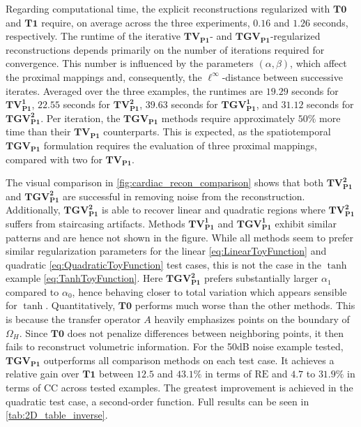 \documentclass{article}
\begin{document}
	
	Regarding computational time, the explicit reconstructions regularized with $\mathbf{T0}$ and $\mathbf{T1}$ require, on average across the three experiments, $0.16$ and $1.26$ seconds, respectively.
	The runtime of the iterative $\mathbf{TV_{P1}}$- and $\mathbf{TGV_{P1}}$-regularized reconstructions depends primarily on the number of iterations required for convergence.
	This number is influenced by the parameters $(\alpha,\beta)$, which affect the proximal mappings and, consequently, the $\ell^\infty$-distance between successive iterates.
	Averaged over the three examples, the runtimes are $19.29$ seconds for $\mathbf{TV_{P1}^1}$, $22.55$ seconds for $\mathbf{TV_{P1}^2}$, $39.63$ seconds for $\mathbf{TGV_{P1}^1}$, and $31.12$ seconds for $\mathbf{TGV_{P1}^2}$.
	Per iteration, the $\mathbf{TGV_{P1}}$ methods require approximately $50\%$ more time than their $\mathbf{TV_{P1}}$ counterparts.
	This is expected, as the spatiotemporal $\mathbf{TGV_{P1}}$ formulation requires the evaluation of three proximal mappings, compared with two for $\mathbf{TV_{P1}}$.
	
	The visual comparison in \cref{fig:cardiac_recon_comparison} shows that both $\mathbf{TV_{P1}^2}$ and $\mathbf{TGV_{P1}^2}$ are successful in removing noise from the reconstruction. 
	Additionally, $\mathbf{TGV_{P1}^2}$ is able to recover linear and quadratic regions where $\mathbf{TV_{P1}^2}$ suffers from staircasing artifacts.
	Methods $\mathbf{TV_{P1}^1}$ and $\mathbf{TGV_{P1}^1}$ exhibit similar patterns and are hence not shown in the figure.
	While all methods seem to prefer similar regularization parameters for the linear \eqref{eq:LinearToyFunction} and quadratic \eqref{eq:QuadraticToyFunction} test cases, this is not the case in the $\tanh$ example \eqref{eq:TanhToyFunction}.
	Here $\mathbf{TGV_{P1}^2}$ prefers substantially larger $\alpha_1$ compared to $\alpha_0$, hence behaving closer to total variation which appears sensible for $\tanh$.
	Quantitatively, $\mathbf{T0}$ performs much worse than the other methods.
	This is because the transfer operator $A$ heavily emphasizes points on the boundary of $\Omega_H$.
	Since $\mathbf{T0}$ does not penalize differences between neighboring points, it then fails to reconstruct volumetric information.
	For the 50dB noise example tested, $\mathbf{TGV_{P1}}$ outperforms all comparison methods on each test case.
	It achieves a relative gain over $\mathbf{T1}$ between $12.5$ and $43.1\%$ in terms of $\mathrm{RE}$ and $4.7$ to $31.9\%$ in terms of $\mathrm{CC}$ across tested examples.
	The greatest improvement is achieved in the quadratic test case, a second-order function.
	Full results can be seen in \cref{tab:2D_table_inverse}.
\end{document}
